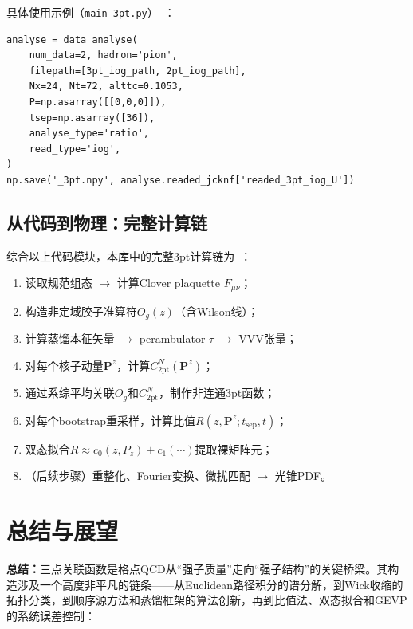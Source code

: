 \documentclass[12pt,a4paper]{ctexart}
\theoremstyle{definition}
\begin{document}
具体使用示例（\texttt{main-3pt.py}）~\cite{main3pt2026}：
\begin{verbatim}
analyse = data_analyse(
    num_data=2, hadron='pion',
    filepath=[3pt_iog_path, 2pt_iog_path],
    Nx=24, Nt=72, alttc=0.1053,
    P=np.asarray([[0,0,0]]),
    tsep=np.asarray([36]),
    analyse_type='ratio',
    read_type='iog',
)
np.save('_3pt.npy', analyse.readed_jcknf['readed_3pt_iog_U'])
\end{verbatim}

\subsection{从代码到物理：完整计算链}

综合以上代码模块，本库中的完整3pt计算链为~\cite{snscMain2026,gluonWorkflow2026,correlationFunctions2026}：
\begin{enumerate}[leftmargin=*]
    \item 读取规范组态 $\to$ 计算Clover plaquette $F_{\mu\nu}$；
    \item 构造非定域胶子准算符$O_g(z)$（含Wilson线）；
    \item 计算蒸馏本征矢量 $\to$ perambulator $\tau$ $\to$ VVV张量；
    \item 对每个核子动量$\mathbf{P}^z$，计算$C_{2\text{pt}}^N(\mathbf{P}^z)$；
    \item 通过系综平均关联$O_g$和$C_{2\text{pt}}^N$，制作非连通3pt函数；
    \item 对每个bootstrap重采样，计算比值$R(z, \mathbf{P}^z; t_{\text{sep}}, t)$；
    \item 双态拟合$R \approx c_0(z, P_z) + c_1(\cdots)$提取裸矩阵元；
    \item（后续步骤）重整化、Fourier变换、微扰匹配 $\to$ 光锥PDF。
\end{enumerate}

\section{总结与展望}

\textbf{总结：}三点关联函数是格点QCD从``强子质量''走向``强子结构''的关键桥梁。其构造涉及一个高度非平凡的链条——从Euclidean路径积分的谱分解，到Wick收缩的拓扑分类，到顺序源方法和蒸馏框架的算法创新，再到比值法、双态拟合和GEVP的系统误差控制：
\end{document}
